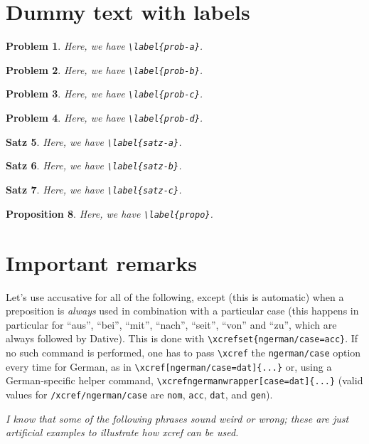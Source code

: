 \documentclass[ngerman]{article}
\newtheorem{problem}{Problem}
\newtheorem{satz}[problem]{Satz}
\newtheorem{proposition}[problem]{Proposition}
\begin{document}
\section{Dummy text with labels}
\label{sec-dummy-text-with-labels}

\begin{problem}\label{prob-a}
Here, we have \verb|\label{prob-a}|.
\end{problem}
\begin{problem}\label{prob-b}
Here, we have \verb|\label{prob-b}|.
\end{problem}
\begin{problem}\label{prob-c}
Here, we have \verb|\label{prob-c}|.
\end{problem}
\begin{problem}\label{prob-d}
Here, we have \verb|\label{prob-d}|.
\end{problem}
\begin{satz}\label{satz-a}
Here, we have \verb|\label{satz-a}|.
\end{satz}
\begin{satz}\label{satz-b}
Here, we have \verb|\label{satz-b}|.
\end{satz}
\begin{satz}\label{satz-c}
Here, we have \verb|\label{satz-c}|.
\end{satz}
\begin{proposition}\label{propo}
Here, we have \verb|\label{propo}|.
\end{proposition}

\section{Important remarks}
\label{sec-important-remarks}

Let's use accusative for all of the following, except (this is automatic) when
a preposition is \emph{always} used in combination with a particular case
(this happens in particular for “aus”, “bei”, “mit”, “nach”, “seit”, “von” and
“zu”, which are always followed by Dative). This is done with
\verb|\xcrefset{ngerman/case=acc}|. If no such command is performed, one has
to pass \verb|\xcref| the \verb|ngerman/case| option every time for German, as
in \verb|\xcref[ngerman/case=dat]{...}| or, using a German-specific helper
command, \verb|\xcrefngermanwrapper[case=dat]{...}| (valid values for
\texttt{/xcref/ngerman/case} are \verb|nom|, \verb|acc|, \verb|dat|, and
\verb|gen|).

\emph{I know that some of the following phrases sound weird or wrong; these
  are just artificial examples to illustrate how \textsf{xcref} can be used.}
\end{document}
